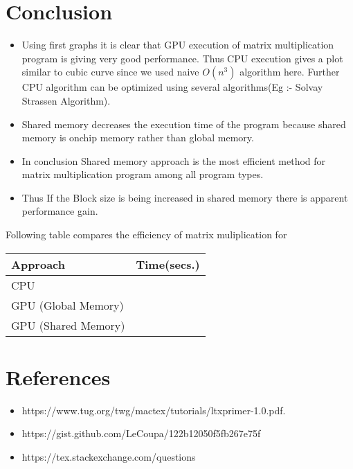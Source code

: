 \documentclass[12pt,oneside,a4paper]{article}
\begin{document}
	\newpage
	\section{Conclusion}

	\begin{itemize}
		\item Using first graphs it is clear that GPU execution of matrix multiplication program is giving very good performance. Thus CPU execution gives a plot similar to cubic curve since we used naive $O(n^3)$ algorithm here. Further CPU algorithm can be optimized using several algorithms(Eg :- Solvay Strassen Algorithm).

		\item Shared memory decreases the execution time of the program because shared memory is onchip memory rather than global memory. 

		\item In conclusion Shared memory approach is the most efficient method for matrix multiplication program among all program types.

		\item Thus If the Block size is being increased in shared memory there is apparent performance gain.
	\end{itemize}

	\hfill \break
	Following table compares the efficiency of matrix muliplication for 
	\hfill \break

	\begin{tabu} to 1 \textwidth { | X[l] | X[r] }
		 \hline
		 Approach & Time(secs.)  \\
		 \hline
		 CPU &   \\
		 \hline
		 GPU (Global Memory) &   \\
		 \hline
		 GPU (Shared Memory) &   \\
		 \hline
	\end{tabu}		

	\newpage


	\section{References}

	\begin{itemize}
	  \item https://www.tug.org/twg/mactex/tutorials/ltxprimer-1.0.pdf.
	  \item https://gist.github.com/LeCoupa/122b12050f5fb267e75f
	  \item https://tex.stackexchange.com/questions
	\end{itemize}
\end{document}
